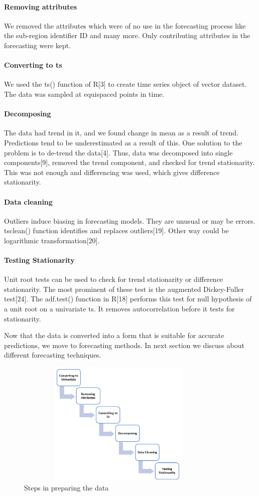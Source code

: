 \documentclass[runningheads]{llncs}
\begin{document}
\paragraph{Removing attributes} We removed the attributes which were of no use in the forecasting process like the sub-region identifier ID and many more. Only contributing attributes in the forecasting were kept.
\paragraph{Converting to ts} We used the ts() function of R[3] to create time series object of vector dataset. The data was sampled at equispaced points in time.
\paragraph{Decomposing} The data had trend in it, and we found change in mean as a result of trend. Predictions tend to be underestimated as a result of this. One solution to the problem is to de-trend the data[4]. Thus, data was decomposed into single components[9], removed the trend component, and checked for trend stationarity. This was not enough and differencing was used, which gives difference stationarity.
\paragraph{Data cleaning} Outliers induce biasing in forecasting models. They are unusual or may be errors.  tsclean() function identifies and replaces outliers[19]. Other way could be logarithmic transformation[20].
\paragraph{Testing Stationarity} Unit root tests can be used to check for trend stationarity or difference stationarity. The most prominent of these test is the augmented Dickey-Fuller test[24]. The adf.test() function in R[18] performs this test for null hypothesis of a unit root on a univariate ts. It removes autocorrelation before it tests for stationarity.

Now that the data is converted into a form that is suitable for accurate predictions, we move to forecasting methods. In next section we discuss about different forecasting techniques.
\begin{figure}
\centering
\includegraphics[scale=1,width=10cm,height=6cm]{chart.png}
\caption[20]{Steps in preparing the data}
\end{figure}
%
%
%
\end{document}
